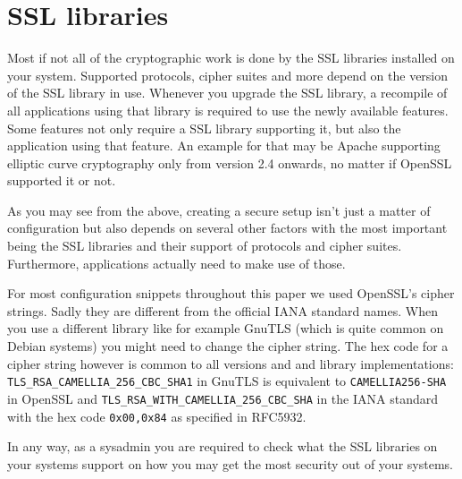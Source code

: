 \section{SSL libraries}
\label{section:ssllibs}


Most if not all of the cryptographic work is done by the SSL libraries installed on
your system. Supported protocols, cipher suites and more depend on the version of
the SSL library in use. Whenever you upgrade the SSL library, a recompile of all
applications using that library is required to use the newly available features.
Some features not only require a SSL library supporting it, but also the application
using that feature. An example for that may be Apache supporting elliptic curve
cryptography only from version 2.4 onwards, no matter if OpenSSL supported it or
not.

As you may see from the above, creating a secure setup isn't just a matter of
configuration but also depends on several other factors with the most important
being the SSL libraries and their support of protocols and cipher suites.
Furthermore, applications actually need to make use of those.

For most configuration snippets throughout this paper we used OpenSSL's cipher
strings. Sadly they are different from the official IANA standard names. When you
use a different library like for example GnuTLS (which is quite common on Debian
systems) you might need to change the cipher string. The hex code for a cipher
string however is common to all versions and and library implementations:
\texttt{TLS\_RSA\_CAMELLIA\_256\_CBC\_SHA1} in GnuTLS is equivalent to
\texttt{CAMELLIA256-SHA} in OpenSSL and \texttt{TLS\_RSA\_WITH\_CAMELLIA\_256\_CBC\_SHA}
in the IANA standard with the hex code \texttt{0x00,0x84} as specified
in RFC5932\cite{rfc5932}.

In any way, as a sysadmin you are required to check what the SSL libraries on
your systems support on how you may get the most security out of your systems.




